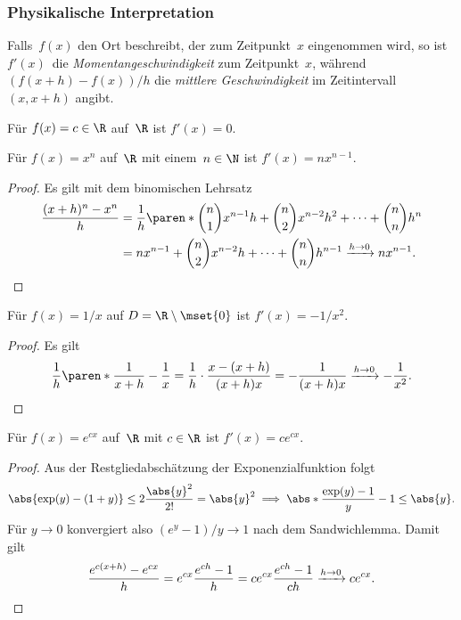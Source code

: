 \documentclass[a4paper]{article}
\begin{document}
\subsubsection{Physikalische Interpretation}

Falls~$f(x)$ den Ort beschreibt, der zum Zeitpunkt~$x$ eingenommen wird, so ist $f'(x)$~die \emph{Momentangeschwindigkeit} zum Zeitpunkt~$x$, während $(f(x+h)-f(x))/h$ die \emph{mittlere Geschwindigkeit} im Zeitintervall $(x,x+h)$ angibt.

\begin{proposition}
    Für $f(x) = c \in \R$ auf~$\R$ ist $f'(x) = 0$.
\end{proposition}

\begin{proposition}
    Für $f(x) = x^n$ auf~$\R$ mit einem~$n \in \N$ ist $f'(x) = nx^{n-1}$.
\end{proposition}

\begin{proof}
    Es gilt mit dem binomischen Lehrsatz
    \begin{align*}
        \frac{(x+h)^n-x^n}{h} & = \frac{1}{h} \paren*{\binom{n}{1}x^{n-1}h + \binom{n}{2}x^{n-2}h^2 + \dots + \binom{n}{n}h^n}         \\
                              & = nx^{n-1} + \binom{n}{2}x^{n-2}h + \dots + \binom{n}{n}h^{n-1} \xrightarrow{h\to0} nx^{n-1}. \qedhere
    \end{align*}
\end{proof}

\begin{proposition}
    Für $f(x) = 1/x$ auf $D = \R\setminus\mset{0}$ ist $f'(x) = -1/x^2$.
\end{proposition}

\begin{proof}
    Es gilt
    \begin{equation*}
        \frac{1}{h} \paren*{\frac{1}{x+h} - \frac{1}{x}} = \frac{1}{h} \cdot \frac{x-(x+h)}{(x+h)x} = -\frac{1}{(x+h)x} \xrightarrow{h\to0} -\frac{1}{x^2}. \qedhere
    \end{equation*}
\end{proof}

\begin{proposition}
    Für $f(x) = e^{cx}$ auf~$\R$ mit $c \in \R$ ist $f'(x) = ce^{cx}$.
\end{proposition}

\begin{proof}
    Aus der Restgliedabschätzung der Exponenzialfunktion folgt
    \begin{equation*}
        \abs{\exp(y)-(1+y)} \leq 2\frac{\abs{y}^2}{2!} = \abs{y}^2 \implies \abs*{\frac{\exp(y)-1}{y} - 1} \leq \abs{y}.
    \end{equation*}
    Für $y \to 0$ konvergiert also $(e^y-1)/y \to 1$ nach dem Sandwichlemma. Damit gilt
    \begin{equation*}
        \frac{e^{c(x+h)}-e^{cx}}{h} = e^{cx} \frac{e^{ch}-1}{h} = ce^{cx} \frac{e^{ch}-1}{ch} \xrightarrow{h\to0} ce^{cx}. \qedhere
    \end{equation*}
\end{proof}
\end{document}
